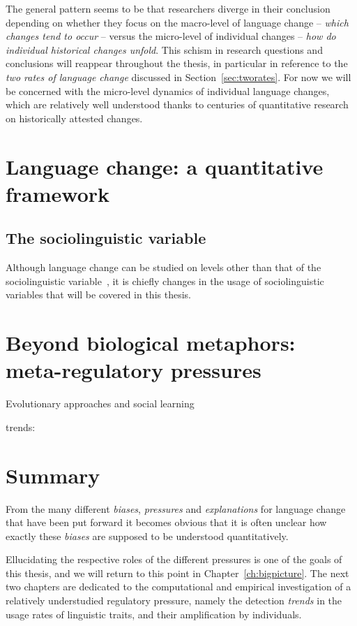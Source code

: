 The general pattern seems to be that researchers diverge in their conclusion depending on whether they focus on the macro-level of language change -- \emph{which changes tend to occur} -- versus the micro-level of individual changes -- \emph{how do individual historical changes unfold}. This schism in research questions and conclusions will reappear throughout the thesis, in particular in reference to the \emph{two rates of language change} discussed in Section~\ref{sec:tworates}. For now we will be concerned with the micro-level dynamics of individual language changes, which are relatively well understood thanks to centuries of quantitative research on historically attested changes.

\section{Language change: a quantitative framework}

\subsection{The sociolinguistic variable}
\label{sec:sociolinguisticvariable}

\citep[p.]{Tagliamonte2012}

Although language change can be studied on levels other than that of the sociolinguistic variable~\citep[see in particular][p.98]{Croft2006}, it is chiefly changes in the usage of sociolinguistic variables that will be covered in this thesis.



\section{Beyond biological metaphors: meta-regulatory pressures}

Evolutionary approaches and social learning



\citep{Altmann2013,Acerbi2014}

trends: \citep{Bikhchandani1992,Bikhchandani1998}

\section{Summary}

From the many different \emph{biases}, \emph{pressures} and \emph{explanations} for language change that have been put forward it becomes obvious that it is often unclear how exactly these \emph{biases} are supposed to be understood quantitatively.

Ellucidating the respective roles of the different pressures is one of the goals of this thesis, and we will return to this point in Chapter~\ref{ch:bigpicture}. The next two chapters are dedicated to the computational and empirical investigation of a relatively understudied regulatory pressure, namely the detection \emph{trends} in the usage rates of linguistic traits, and their amplification by individuals.
